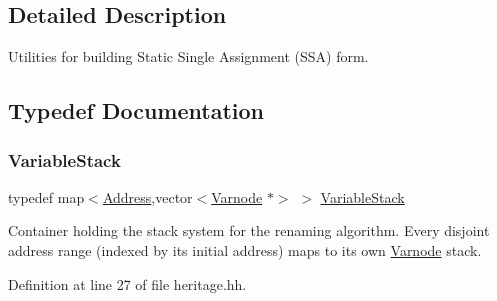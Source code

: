 \subsection{Detailed Description}
Utilities for building Static Single Assignment (S\+SA) form. 



\subsection{Typedef Documentation}
\mbox{\label{heritage_8hh_a06c866be068de18f657eeea50b3790ba}} 
\subsubsection{\texorpdfstring{VariableStack}{VariableStack}}
{\footnotesize\ttfamily typedef map$<$\mbox{\hyperlink{class_address}{Address}},vector$<$\mbox{\hyperlink{class_varnode}{Varnode}} $\ast$$>$ $>$ \mbox{\hyperlink{heritage_8hh_a06c866be068de18f657eeea50b3790ba}{Variable\+Stack}}}

Container holding the stack system for the renaming algorithm. Every disjoint address range (indexed by its initial address) maps to its own \mbox{\hyperlink{class_varnode}{Varnode}} stack. 

Definition at line 27 of file heritage.\+hh.

